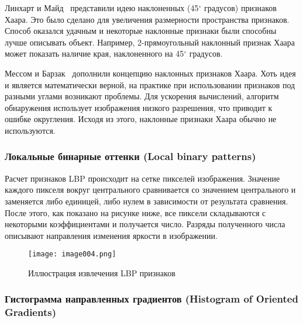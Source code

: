 Линхарт и Майд~\cite{four} представили идею наклоненных (45$^{\circ}$ градусов) признаков Хаара. Это было сделано для увеличения размерности пространства признаков. Способ оказался удачным и некоторые наклонные признаки были способны лучше описывать объект. Например, 2-прямоугольный наклонный признак Хаара может показать наличие края, наклоненного на 45$^{\circ}$ градусов.

Мессом и Барзак~\cite{five} дополнили концепцию наклонных признаков Хаара. Хоть идея и является математически верной, на практике при использовании признаков под разными углами возникают проблемы. Для ускорения вычислений, алгоритм обнаружения использует изображения низкого разрешения, что приводит к ошибке округления. Исходя из этого, наклонные признаки Хаара обычно не используются.

\subsubsection{Локальные бинарные оттенки (Local binary patterns)}

Расчет признаков LBP происходит на сетке пикселей изображения. Значение каждого пикселя вокруг центрального сравнивается со значением центрального и заменяется либо единицей, либо нулем в зависимости от результата сравнения. После этого, как показано на рисунке ниже, все пиксели складываются с некоторыми коэффициентами и получается число. Разряды полученного числа описывают направления изменения яркости в изображении.

\begin{figure}[htbp]
\centering
\texttt{[image: image004.png]}
\caption{Иллюстрация извлечения LBP признаков~\cite{six}}%
\label{fig:how-to-do-research}
\end{figure}

\subsubsection{Гистограмма направленных градиентов (Histogram of Oriented Gradients)}

